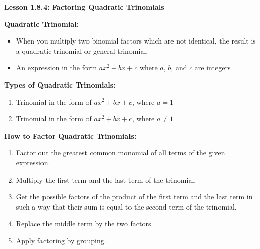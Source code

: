 \begin{center}
\textbf{Lesson 1.8.4: Factoring Quadratic Trinomials}
\end{center}

\vspace*{1ex}

\textbf{Quadratic Trinomial:} 
\begin{itemize}
   \item When you multiply two binomial factors which are not identical, the result is a quadratic trinomial or general trinomial.
   \item An expression in the form $ ax^2 + bx + c $ where $ a $, $ b $, and $ c $ are integers 
\end{itemize}
 
 
\textbf{Types of Quadratic Trinomials:}
		
		\begin{enumerate}
			\item Trinomial in the form of $ ax^2 + bx + c $, where $ a=1 $
			\item Trinomial in the form of $ ax^2 + bx + c $, where $ a \neq 1 $
		\end{enumerate}
		
\textbf{How to Factor Quadratic Trinomials:}
    	\begin{enumerate}
    		\item Factor out the greatest common monomial of all terms of the given expression.
    		\item Multiply the first term and the last term of the trinomial.  		
    		\item Get the possible factors of the product of the first term and the last term in such a way that their sum is equal to the second term of the trinomial.    		
    		\item Replace the middle term by the two factors.
    		\item Apply factoring by grouping.
    	\end{enumerate} 		
